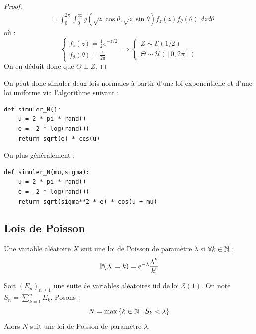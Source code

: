 \begin{proof}
\begin{align*}
            &=  \int_{0}^{2 \pi} \int_{0}^{\infty} g(\sqrt{z} \cos \theta, \sqrt{z} \sin \theta) f_z(z) f_\theta ( \theta) \; dz d \theta 
        \end{align*}
    où : 
        $$ 
            \begin{cases}
                f_z(z) = \frac{1}{2} e^{-z / 2} \\
                f_\theta (\theta) = \frac{1}{2 \pi}   
            \end{cases}
            \Longrightarrow 
            \begin{cases}
                Z \sim \mathcal{E}(1/2) \\ 
                \Theta \sim \mathcal{U}([0, 2 \pi])  
            \end{cases}
        $$
    On en déduit donc que $ \Theta \perp Z$. 
\end{proof}

\begin{proposition}
    On peut donc simuler deux lois normales à partir d'une loi exponentielle et d'une loi uniforme via l'algorithme suivant :
    \begin{lstlisting}
def simuler_N(): 
    u = 2 * pi * rand() 
    e = -2 * log(rand())
    return sqrt(e) * cos(u)
    \end{lstlisting}
    Ou plus généralement : 
    \begin{lstlisting}
def simuler_N(mu,sigma): 
    u = 2 * pi * rand() 
    e = -2 * log(rand())
    return sqrt(sigma**2 * e) * cos(u + mu)
    \end{lstlisting}
\end{proposition}

\subsection{Lois de Poisson}

\begin{rappel}
    Une variable aléatoire $X$ suit une loi de Poisson de paramètre $ \lambda$ si $ \forall k \in \mathbb{N}$ : 
        $$ \mathbb{P}(X = k) = e^{- \lambda} \frac{ \lambda^k}{k !} $$  
\end{rappel}

\begin{prop}
    Soit $(E_n)_{n \geqslant 1}$ une suite de variables aléatoires iid de loi $ \mathcal{E}(1)$. 
    On note $ S_n = \sum_{k=1}^{n} E_k$. Posons : 
        $$ N = \max \left\{k \in \mathbb{N} \; | \; S_k < \lambda \right\} $$ 
    Alors $N$ suit une loi de Poisson de paramètre $ \lambda$.  
\end{prop}

